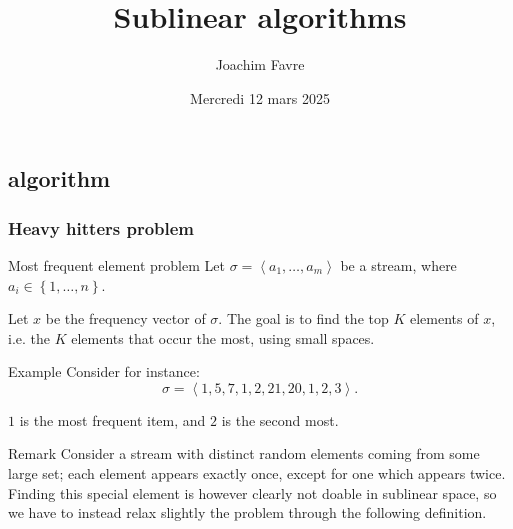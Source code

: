 \documentclass[a4paper]{article}
\title{Sublinear algorithms}
\author{Joachim Favre}
\date{Mercredi 12 mars 2025}
\begin{document}
\maketitle


\subsection{ algorithm}
\subsubsection{Heavy hitters problem}

\begin{parag}{Most frequent element problem}
    Let $\sigma = \left\langle a_1, \ldots, a_m \right\rangle$ be a stream, where $a_i \in \left\{1, \ldots, n\right\}$. 

    Let $x$ be the frequency vector of $\sigma$. The goal is to find the top $K$ elements of $x$, i.e. the $K$ elements that occur the most, using small spaces.

    \begin{subparag}{Example}
        Consider for instance: 
        \[\sigma = \left\langle 1, 5, 7, 1, 2, 21, 20, 1, 2, 3 \right\rangle.\]

        $1$ is the most frequent item, and $2$ is the second most.
    \end{subparag}
    
    \begin{subparag}{Remark}
        Consider a stream with distinct random elements coming from some large set; each element appears exactly once, except for one which appears twice. Finding this special element is however clearly not doable in sublinear space, so we have to instead relax slightly the problem through the following definition.
    \end{subparag}
\end{parag}
\end{document}
